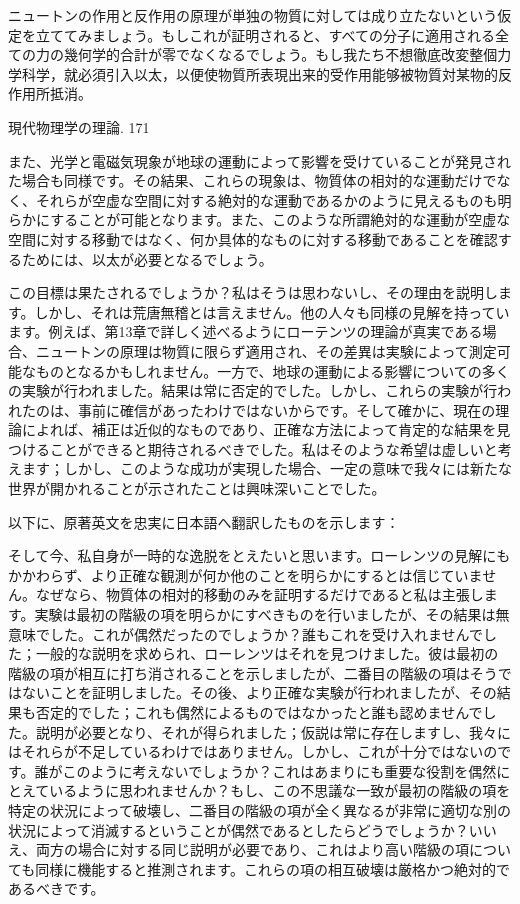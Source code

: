 \documentclass[a4paper,11pt,openany]{ltjsbook}
\begin{document}
ニュートンの作用と反作用の原理が単独の物質に対しては成り立たないという仮定を立ててみましょう。もしこれが証明されると、すべての分子に適用される全ての力の幾何学的合計が零でなくなるでしょう。もし我たち不想徹底改変整個力学科学，就必須引入以太，以便使物質所表現出来的受作用能够被物質対某物的反作用所抵消。

現代物理学の理論. 171

また、光学と電磁気現象が地球の運動によって影響を受けていることが発見された場合も同様です。その結果、これらの現象は、物質体の相対的な運動だけでなく、それらが空虚な空間に対する絶対的な運動であるかのように見えるものも明らかにすることが可能となります。また、このような所謂絶対的な運動が空虚な空間に対する移動ではなく、何か具体的なものに対する移動であることを確認するためには、以太が必要となるでしょう。

この目標は果たされるでしょうか？私はそうは思わないし、その理由を説明します。しかし、それは荒唐無稽とは言えません。他の人々も同様の見解を持っています。例えば、第13章で詳しく述べるようにローテンツの理論が真実である場合、ニュートンの原理は物質に限らず適用され、その差異は実験によって測定可能なものとなるかもしれません。一方で、地球の運動による影響についての多くの実験が行われました。結果は常に否定的でした。しかし、これらの実験が行われたのは、事前に確信があったわけではないからです。そして確かに、現在の理論によれば、補正は近似的なものであり、正確な方法によって肯定的な結果を見つけることができると期待されるべきでした。私はそのような希望は虚しいと考えます；しかし、このような成功が実現した場合、一定の意味で我々には新たな世界が開かれることが示されたことは興味深いことでした。

以下に、原著英文を忠実に日本語へ翻訳したものを示します：

そして今、私自身が一時的な逸脱をとえたいと思います。ローレンツの見解にもかかわらず、より正確な観測が何か他のことを明らかにするとは信じていません。なぜなら、物質体の相対的移動のみを証明するだけであると私は主張します。実験は最初の階級の項を明らかにすべきものを行いましたが、その結果は無意味でした。これが偶然だったのでしょうか？誰もこれを受け入れませんでした；一般的な説明を求められ、ローレンツはそれを見つけました。彼は最初の階級の項が相互に打ち消されることを示しましたが、二番目の階級の項はそうではないことを証明しました。その後、より正確な実験が行われましたが、その結果も否定的でした；これも偶然によるものではなかったと誰も認めませんでした。説明が必要となり、それが得られました；仮説は常に存在しますし、我々にはそれらが不足しているわけではありません。しかし、これが十分ではないのです。誰がこのように考えないでしょうか？これはあまりにも重要な役割を偶然にとえているように思われませんか？もし、この不思議な一致が最初の階級の項を特定の状況によって破壊し、二番目の階級の項が全く異なるが非常に適切な別の状況によって消滅するということが偶然であるとしたらどうでしょうか？いいえ、両方の場合に対する同じ説明が必要であり、これはより高い階級の項についても同様に機能すると推測されます。これらの項の相互破壊は厳格かつ絶対的であるべきです。
\end{document}
